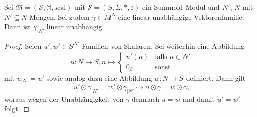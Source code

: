 \documentclass{article}
\begin{document}
\begin{lemma}\label{Lemma_UnabhEinschr}
  Sei $\mathfrak{M} = (\mathcal{S}, \mathbb{M}, \text{scal})$
  mit $\mathcal{S} = (S, \Sigma, \ast, \varepsilon)$ ein Summoid-Modul
  und $N'$, $N$ mit $N' \subseteq N$ Mengen.
  Sei zudem $\gamma \in M^N$ eine linear unabhängige Vektorenfamilie.
  Dann ist $\gamma_{\mid N'}$ linear unabhängig.
\end{lemma}
\begin{proof}
  Seien $u', w' \in S^{N'}$ Familien von Skalaren.
  Sei weiterhin eine Abbildung
  \begin{equation*}
    u \colon N \to S, n \mapsto
    \begin{cases}
      u'(n) & \text{falls } n \in N' \\
      0_\mathcal{S} & \text{sonst}
    \end{cases}
  \end{equation*}
  mit $u_{\mid N'} = u'$ sowie analog dazu eine Abbildung $w \colon N \to S$ definiert.
  Dann gilt
  \begin{equation*}
    u' \odot \gamma_{\mid N'} = w' \odot \gamma_{\mid N'} \iff u \odot \gamma = w \odot \gamma,
  \end{equation*}
  woraus wegen der Unabhängigkeit von $\gamma$ demnach $u = w$ und damit $u' = w'$ folgt.
\end{proof}
\end{document}
